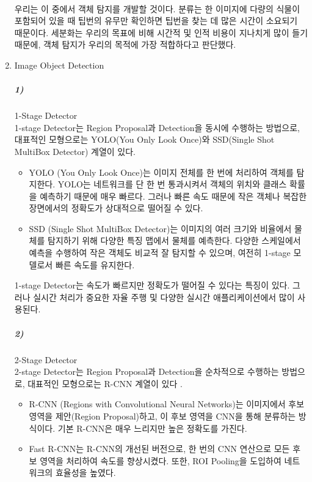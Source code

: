 \documentclass[11pt]{article}
\begin{document}
\begin{enumerate}
    \paragraph{} 우리는 이 중에서 객체 탐지를 개발할 것이다. 분류는 한 이미지에 다량의 식물이 포함되어 있을 때 팁번의 유무만 확인하면 팁번을 찾는 데 많은 시간이 소요되기 때문이다. 세분화는 우리의 목표에 비해 시간적 및 인적 비용이 지나치게 많이 들기 때문에, 객체 탐지가 우리의 목적에 가장 적합하다고 판단했다.

        \item {Image Object Detection}
    \subparagraph{1)} 1-Stage Detector \\
    1-stage Detector는 Region Proposal과 Detection을 동시에 수행하는 방법으로, 대표적인 모형으로는 YOLO(You Only Look Once)와 SSD(Single Shot MultiBox Detector) 계열이 있다.

    \begin{itemize}
        \item {YOLO (You Only Look Once)는 이미지 전체를 한 번에 처리하여 객체를 탐지한다. YOLO는 네트워크를 단 한 번 통과시켜서 객체의 위치와 클래스 확률을 예측하기 때문에 매우 빠르다. 그러나 빠른 속도 때문에 작은 객체나 복잡한 장면에서의 정확도가 상대적으로 떨어질 수 있다.}

        \item {SSD (Single Shot MultiBox Detector)는 이미지의 여러 크기와 비율에서 물체를 탐지하기 위해 다양한 특징 맵에서 물체를 예측한다. 다양한 스케일에서 예측을 수행하여 작은 객체도 비교적 잘 탐지할 수 있으며, 여전히 1-stage 모델로서 빠른 속도를 유지한다.}
    \end{itemize}

    1-stage Detector는 속도가 빠르지만 정확도가 떨어질 수 있다는 특징이 있다. 그러나 실시간 처리가 중요한 자율 주행 및 다양한 실시간 애플리케이션에서 많이 사용된다.

    \subparagraph{2)} 2-Stage Detector \\
    2-stage Detector는 Region Proposal과 Detection을 순차적으로 수행하는 방법으로, 대표적인 모형으로는 R-CNN 계열이 있다 \citep{park20244}.
    
    \begin{itemize}
        \item {R-CNN (Regions with Convolutional Neural Networks)는 이미지에서 후보 영역을 제안(Region Proposal)하고, 이 후보 영역을 CNN을 통해 분류하는 방식이다. 기본 R-CNN은 매우 느리지만 높은 정확도를 가진다.}

        \item {Fast R-CNN는 R-CNN의 개선된 버전으로, 한 번의 CNN 연산으로 모든 후보 영역을 처리하여 속도를 향상시켰다. 또한, ROI Pooling을 도입하여 네트워크의 효율성을 높였다.}


\end{itemize}
\end{enumerate}
\end{document}

